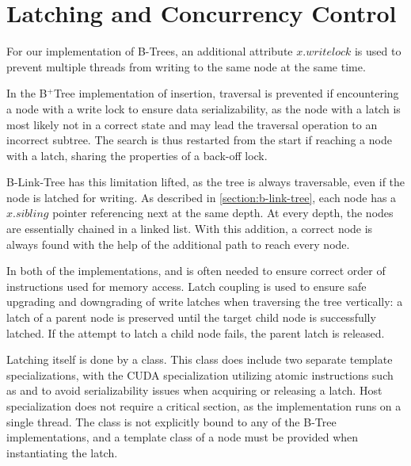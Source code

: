\section{Latching and Concurrency Control}

For our implementation of B-Trees, an additional attribute $x.writelock$ is used to prevent multiple threads from writing to the same node at the same time.

In the B$^+$Tree implementation of insertion, traversal is prevented if encountering a node with a write lock to ensure data serializability, as the node with a latch is most likely not in a correct state and may lead the traversal operation to an incorrect subtree. The search is thus restarted from the start if reaching a node with a latch, sharing the properties of a back-off lock.

B-Link-Tree has this limitation lifted, as the tree is always traversable, even if the node is latched for writing. As described in \cref{section:b-link-tree}, each node has a $x.sibling$ pointer referencing next at the same depth. At every depth, the nodes are essentially chained in a linked list. With this addition, a correct node is always found with the help of the additional path to reach every node.

In both of the implementations,  and  is often needed to ensure correct order of instructions used for memory access. Latch coupling is used to ensure safe upgrading and downgrading of write latches when traversing the tree vertically: a latch of a parent node is preserved until the target child node is successfully latched. If the attempt to latch a child node fails, the parent latch is released.

Latching itself is done by a  class. This class does include two separate template specializations, with the CUDA specialization utilizing atomic instructions such as  and  to avoid serializability issues when acquiring or releasing a latch. Host specialization does not require a critical section, as the implementation runs on a single thread. The class is not explicitly bound to any of the B-Tree implementations, and a template class of a node must be provided when instantiating the latch.